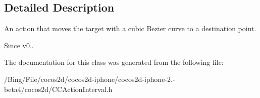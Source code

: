 \subsection{Detailed Description}
An action that moves the target with a cubic Bezier curve to a destination point. \begin{DoxySince}{Since}
v0.. 
\end{DoxySince}


The documentation for this class was generated from the following file\-:\begin{DoxyCompactItemize}
\item 
/\-Bing/\-File/cocos2d/cocos2d-\/iphone/cocos2d-\/iphone-\/2.-\/beta4/cocos2d/C\-C\-Action\-Interval.\-h\end{DoxyCompactItemize}
